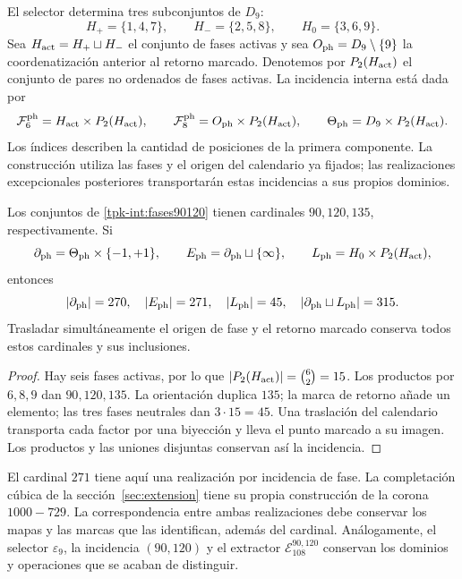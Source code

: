 El selector determina tres subconjuntos de \(D_9\):
\[
 H_+=\{1,4,7\},\qquad H_-=\{2,5,8\},\qquad H_0=\{3,6,9\}.
\]
Sea \(H_{\rm act}=H_+\sqcup H_-\) el conjunto de fases activas y
sea \(O_{\rm ph}=D_9\setminus\{9\}\) la coordenatización anterior al retorno
marcado. Denotemos por \(P_2(H_{\rm act})\) el conjunto de pares
no ordenados de fases activas. La incidencia interna está dada por
\begin{equation}
 \mathcal F^{\rm ph}_6=H_{\rm act}\times P_2(H_{\rm act}),\qquad
 \mathcal F^{\rm ph}_8=O_{\rm ph}\times P_2(H_{\rm act}),\qquad
 \Theta_{\rm ph}=D_9\times P_2(H_{\rm act}).
 \label{tpk-int:fases90120}
\end{equation}
Los índices describen la cantidad de posiciones de la primera componente.
La construcción utiliza las fases y el origen del calendario ya fijados;
las realizaciones excepcionales posteriores transportarán estas
incidencias a sus propios dominios.

\begin{proposition}
\label{tpk-int:cardinales}
Los conjuntos de \eqref{tpk-int:fases90120} tienen cardinales
\(90,120,135\), respectivamente. Si
\[
 \partial_{\rm ph}=\Theta_{\rm ph}\times\{-1,+1\},\qquad
 E_{\rm ph}=\partial_{\rm ph}\sqcup\{\infty\},\qquad
 L_{\rm ph}=H_0\times P_2(H_{\rm act}),
\]
entonces
\[
 |\partial_{\rm ph}|=270,\quad |E_{\rm ph}|=271,\quad
 |L_{\rm ph}|=45,\quad
 |\partial_{\rm ph}\sqcup L_{\rm ph}|=315.
\]
Trasladar simultáneamente el origen de fase y el retorno marcado conserva
todos estos cardinales y sus inclusiones.
\end{proposition}
\begin{proof}
Hay seis fases activas, por lo que
\(|P_2(H_{\rm act})|=\binom62=15\). Los productos por
\(6,8,9\) dan \(90,120,135\). La orientación duplica \(135\);
la marca de retorno añade un elemento; las tres fases neutrales dan
\(3\cdot15=45\). Una traslación del calendario transporta cada
factor por una biyección y lleva el punto marcado a su imagen. Los
productos y las uniones disjuntas conservan así la incidencia.
\end{proof}

El cardinal \(271\) tiene aquí una realización por incidencia de
fase. La completación cúbica de la sección~\ref{sec:extension} tiene
su propia construcción de la corona \(1000-729\). La correspondencia
entre ambas realizaciones debe conservar los mapas y las marcas que las
identifican, además del cardinal. Análogamente, el selector
\(\varepsilon_9\), la incidencia \((90,120)\) y el extractor
\(\mathcal E_{108}^{90,120}\) conservan los dominios y operaciones
que se acaban de distinguir.

